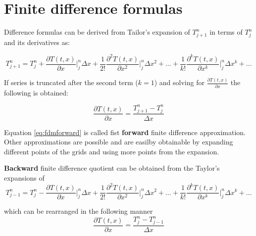     
    \section{Finite difference formulas}


    
    Difference formulas can be derived from Tailor's expansion of $T^n_{j+1}$ in terms of $T^n_{j}$ and its derivatives as:
    
    \begin{equation}
    T^n_{j+1} = T^n_{j} +
    \frac{\partial T(t,x)}{\partial x}\bigg\rvert^n_j \Delta x +
    \frac{1}{2!}  \frac{\partial^2 T(t,x)}{\partial x^2}\bigg\rvert^n_j \Delta x^2 + \ldots + 
     \frac{1}{k!}  \frac{\partial^k T(t,x)}{\partial x^k}\bigg\rvert^n_j \Delta x^k + \ldots
     \label{eq:taylorexp1}
    \end{equation}
    
    If series is truncated after the second term ($k=1$) and solving for $\frac{\partial T(t,x)}{\partial x}$ the following is obtained:
    
    \begin{equation}
    \frac{\partial T(t,x)}{\partial x}  = \frac{T^n_{j+1} - T^n_{j}}{\Delta x}
    \label{eq:fdmforward}
    \end{equation}
    
    Equation \ref{eq:fdmforward} is called fist \textbf{forward} finite difference approximation. Other approximations are possible and are easilby obtainable by expanding different points of the grids and using more points from the expansion.
    
    \textbf{Backward} finite difference quotient can be obtained from the Taylor's expansions of    
        \begin{equation}
    T^n_{j-1} = T^n_{j} - 
    \frac{\partial T(t,x)}{\partial x}\bigg\rvert^n_j \Delta x +
    \frac{1}{2!}  \frac{\partial^2 T(t,x)}{\partial x^2}\bigg\rvert^n_j \Delta x^2 + \ldots + 
     \frac{1}{k!}  \frac{\partial^k T(t,x)}{\partial x^k}\bigg\rvert^n_j \Delta x^k + \ldots
     \label{eq:taylorexp2}
    \end{equation}
    
    which can be rearranged in the following manner
        \begin{equation}
    \frac{\partial T(t,x)}{\partial x}  = \frac{T^n_{j} - T^n_{j-1}}{\Delta x}
    \label{eq:fdmfbackward}
    \end{equation}
    
